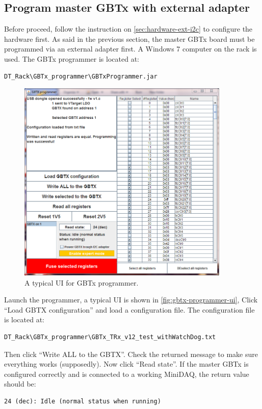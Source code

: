 \subsection{Program master GBTx with external \itwoc adapter}
Before proceed, follow the instruction on \autoref{sec:hardware-ext-i2c} to
configure the hardware first.
As said in the previous section, the master GBTx board must be programmed via an
external \itwoc adapter first.
A Windows 7 computer on the rack is used. The GBTx programmer is located at:

\begin{verbatim}
DT_Rack\GBTx_programmer\GBTxProgrammer.jar
\end{verbatim}

\begin{figure}[ht]
    \centering
    \includegraphics[width=0.9\textwidth]{res/gbtx_programmer_v1_ui.png}
    \caption{A typical UI for GBTx programmer.}
    \label{fig:gbtx-programmer-ui}
\end{figure}

Launch the programmer, a typical UI is shown in
\autoref{fig:gbtx-programmer-ui},
Click ``Load GBTX configuration'' and load a configuration file.
The configuration file is located at:

\begin{verbatim}
DT_Rack\GBTx_programmer\GBTx_TRx_v12_test_withWatchDog.txt
\end{verbatim}

Then click ``Write ALL to the GBTX''. Check the returned message to make sure
everything works (supposedly).
Now click ``Read state''.
If the master GBTx is configured correctly and is connected to a working
MiniDAQ, the return value should be:

\begin{verbatim}
24 (dec): Idle (normal status when running)
\end{verbatim}
